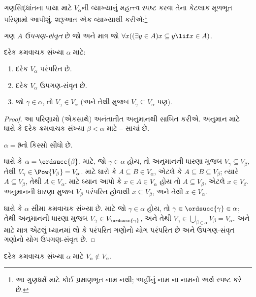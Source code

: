 ગણસિદ્ધાંતના પાયા માટે $V_\alpha$ની વ્યાખ્યાનું મહત્ત્વ
સ્પષ્ટ કરવા તેના કેટલાક મૂળભૂત પરિણામો આપીશું. શરૂઆત એક
વ્યાખ્યાથી કરીએ:\footnote{આ ગુણધર્મ માટે કોઈ પ્રમાણભૂત નામ નથી;
અહીંનું નામ \citet{ButtonLT1}ના નામનો અર્થ સ્પષ્ટ કરે છે.}
\begin{defn}
	ગણ $A$ \emph{ઉપગણ-સંવૃત} છે જો અને માત્ર જો
	$\forall x((\exists y \in A)x \subseteq y \lif x \in A)$.
\end{defn}
\begin{lem}
દરેક ક્રમવાચક સંખ્યા $\alpha$ માટે:
\begin{enumerate}
	\item{} દરેક $V_\alpha$ પરંપરિત છે.
	\item{} દરેક $V_\alpha$ ઉપગણ-સંવૃત છે.
	\item{} જો $\gamma \in \alpha$, તો $V_\gamma
	\in V_\alpha$ (અને તેથી  મુજબ
	$V_\gamma \subseteq V_\alpha$ પણ).
\end{enumerate}
\end{lem}

\begin{proof}
આ પરિણામો (એકસાથે) અનંતાતીત અનુમાનથી સાબિત કરીએ. અનુમાન માટે
ધારો કે દરેક ક્રમવાચક સંખ્યા $\beta < \alpha$ માટે
-- સાચાં છે.

$\alpha = \emptyset$નો કિસ્સો સીધો છે.

ધારો કે $\alpha = \ordsucc{\beta}$.  માટે,
જો $\gamma \in \alpha$ હોય, તો અનુમાનની ધારણા મુજબ
$V_\gamma \subseteq V_\beta$, તેથી
$V_\gamma \in \Pow{V_\beta} = V_\alpha$. 
માટે ધારો કે $A \subseteq B \in V_\alpha$, એટલે કે $A
\subseteq B \subseteq V_\beta$; ત્યારે $A \subseteq V_\beta$,
તેથી $A \in
V_\alpha$.  માટે ધ્યાન આપો કે $x \in A \in
V_\alpha$ હોય તો $A \subseteq V_\beta$, એટલે $x \in V_\beta$.
અનુમાનની ધારણા મુજબ $V_\beta$ પરંપરિત હોવાથી $x
\subseteq V_\beta$, અને તેથી $x
\in V_\alpha$.

ધારો કે $\alpha$ સીમા ક્રમવાચક સંખ્યા છે. 
માટે જો $\gamma \in \alpha$ હોય, તો
$\gamma \in \ordsucc{\gamma} \in \alpha$; તેથી અનુમાનની ધારણા
મુજબ $V_\gamma \in V_{\ordsucc{\gamma}}$, અને તેથી
$V_\gamma \in \bigcup_{\beta \in \alpha} V_\beta = V_\alpha$.
 અને  માટે માત્ર
એટલું ધ્યાનમાં લો કે પરંપરિત ગણોનો યોગ પરંપરિત છે અને
ઉપગણ-સંવૃત ગણોનો યોગ ઉપગણ-સંવૃત છે.
\end{proof}

\begin{lem}
દરેક ક્રમવાચક સંખ્યા $\alpha$ માટે $V_\alpha \notin V_\alpha$.
\end{lem}

